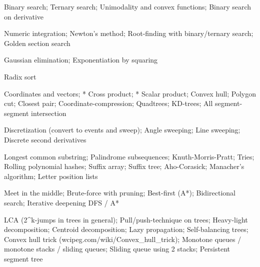 \begin{multicols}{\Columns}
 \par
{} Binary search; Ternary search; Unimodality and convex functions; Binary search on derivative\par
{} Numeric integration; Newton's method; Root-finding with binary/ternary search; Golden section search\par
{} Gaussian elimination; Exponentiation by squaring\par
{} Radix sort\par
{} Coordinates and vectors; * Cross product; * Scalar product; Convex hull; Polygon cut; Closest pair; Coordinate-compression; Quadtrees; KD-trees; All segment-segment intersection\par
{} Discretization (convert to events and sweep); Angle sweeping; Line sweeping; Discrete second derivatives\par
{} Longest common substring; Palindrome subsequences; Knuth-Morris-Pratt; Tries; Rolling polynomial hashes; Suffix array; Suffix tree; Aho-Corasick; Manacher's algorithm; Letter position lists\par
{} Meet in the middle; Brute-force with pruning; Best-first (A*); Bidirectional search; Iterative deepening DFS / A*\par
{} LCA (2\textasciicircum{}k-jumps in trees in general); Pull/push-technique on trees; Heavy-light decomposition; Centroid decomposition; Lazy propagation; Self-balancing trees; Convex hull trick (wcipeg.com/wiki/Convex\_hull\_trick); Monotone queues / monotone stacks / sliding queues; Sliding queue using 2 stacks; Persistent segment tree\par
\label{last-page}\end{multicols}

